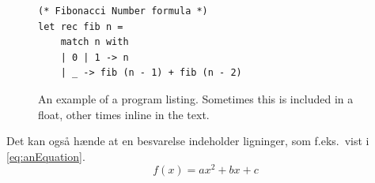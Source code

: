 \documentclass[a4paper]{article}
\begin{document}
\begin{figure}
  \lstset{language=FSharp}
\begin{lstlisting}
(* Fibonacci Number formula *)
let rec fib n =
    match n with
    | 0 | 1 -> n
    | _ -> fib (n - 1) + fib (n - 2)
\end{lstlisting}
  \caption{An example of a program listing. Sometimes this is included in a float, other times inline in the text.}
  \label{fig:fsharpCodeExample}
\end{figure}
Det kan også hænde at en besvarelse indeholder ligninger, som f.eks.\ vist i \eqref{eq:anEquation}.
\begin{equation}
  \label{eq:anEquation}
  f(x)=ax^2+bx+c
\end{equation}
\end{document}
